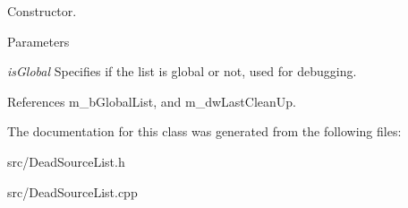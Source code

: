 Constructor. 
\begin{DoxyParams}{Parameters}
\item[{\em isGlobal}]Specifies if the list is global or not, used for debugging. \end{DoxyParams}


References m\_\-bGlobalList, and m\_\-dwLastCleanUp.

The documentation for this class was generated from the following files:\begin{DoxyCompactItemize}
\item 
src/DeadSourceList.h\item 
src/DeadSourceList.cpp\end{DoxyCompactItemize}
